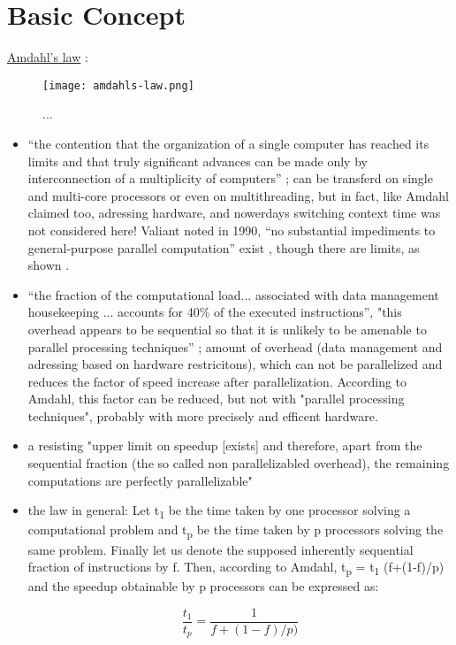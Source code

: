 \section{Basic Concept}

\underline{Amdahl's law} \parencite{book6}:

\begin{figure}[h!]\centering
\texttt{[image: amdahls-law.png]}
\caption{
...
}
\label{fig:admLaw}
\end{figure}

\begin{itemize}
\item “the contention that the organization of a single computer has reached its limits and that
truly significant advances can be made only by interconnection of a multiplicity of computers” \parencite[see][p80]{inbook1}; can be transferd on single and multi-core processors or even on multithreading, but in fact, like Amdahl claimed too, adressing hardware, and nowerdays switching context time was not considered here!
Valiant noted in 1990, “no substantial impediments to general-purpose parallel
computation” exist \parencite[see][p85]{inbook1}, though there are limits, as shown \parencite[seein Sec. 10][p85]{inbook1}.

\newpage

\item “the fraction of the computational load... associated with data management housekeeping ... accounts for 40\% of the executed instructions”, "this overhead appears to be sequential so that it is unlikely to be amenable to parallel processing techniques” \parencite[see][p80]{inbook1}; amount of overhead (data management and adressing based on hardware restricitons), which can not be parallelized and reduces the factor of speed increase after parallelization. According to Amdahl, this factor can be reduced, but not with "parallel processing techniques", probably with more precisely and efficent hardware.
\item a resisting "upper limit on speedup [exists] and therefore, apart from the sequential fraction (the so called non parallelizabled overhead), the remaining computations are perfectly parallelizable" \parencite[see][p81]{inbook1}
\item the law in general: Let t\textsubscript{1} be the time taken by one processor solving a computational problem and t\textsubscript{p} be the time taken by p processors solving the same problem. Finally let us denote the supposed inherently sequential fraction of instructions by f. Then, according to Amdahl, t\textsubscript{p} = t\textsubscript{1} (f+(1-f)/p) and the speedup obtainable by p processors can be expressed as:

	
\[ \frac{t_1}{t_p} = \frac{1}{f + (1 - f) / p)} \]
\end{itemize}

